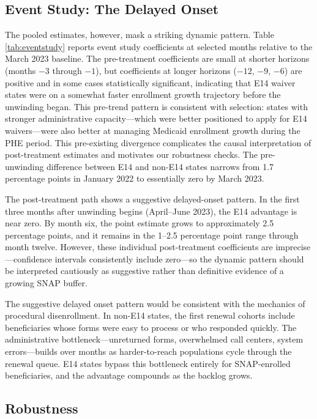 \documentclass[12pt]{article}
\begin{document}
\subsection{Event Study: The Delayed Onset}

The pooled estimates, however, mask a striking dynamic pattern. Table \ref{tab:eventstudy} reports event study coefficients at selected months relative to the March 2023 baseline. The pre-treatment coefficients are small at shorter horizons (months $-3$ through $-1$), but coefficients at longer horizons ($-12$, $-9$, $-6$) are positive and in some cases statistically significant, indicating that E14 waiver states were on a somewhat faster enrollment growth trajectory before the unwinding began. This pre-trend pattern is consistent with selection: states with stronger administrative capacity---which were better positioned to apply for E14 waivers---were also better at managing Medicaid enrollment growth during the PHE period. This pre-existing divergence complicates the causal interpretation of post-treatment estimates and motivates our robustness checks. The pre-unwinding difference between E14 and non-E14 states narrows from 1.7 percentage points in January 2022 to essentially zero by March 2023.

The post-treatment path shows a suggestive delayed-onset pattern. In the first three months after unwinding begins (April--June 2023), the E14 advantage is near zero. By month six, the point estimate grows to approximately 2.5 percentage points, and it remains in the 1--2.5 percentage point range through month twelve. However, these individual post-treatment coefficients are imprecise---confidence intervals consistently include zero---so the dynamic pattern should be interpreted cautiously as suggestive rather than definitive evidence of a growing SNAP buffer.

The suggestive delayed onset pattern would be consistent with the mechanics of procedural disenrollment. In non-E14 states, the first renewal cohorts include beneficiaries whose forms were easy to process or who responded quickly. The administrative bottleneck---unreturned forms, overwhelmed call centers, system errors---builds over months as harder-to-reach populations cycle through the renewal queue. E14 states bypass this bottleneck entirely for SNAP-enrolled beneficiaries, and the advantage compounds as the backlog grows.

\subsection{Robustness}
\end{document}
